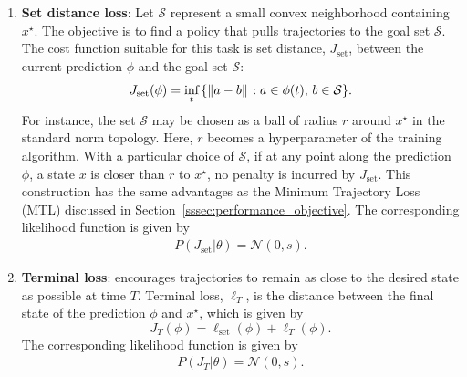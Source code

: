 \begin{enumerate}
\begin{figure}
    \end{figure}
    \item \textbf{Set distance loss}: Let $\mathcal{S}$ represent a small convex
    neighborhood containing $x^\star$. The objective is to find a policy that
    pulls trajectories to the goal set $\mathcal{S}$. The cost function suitable
    for this task is set distance, $J_{\textrm{set}}$, between the current
    prediction $\phi$ and the goal set $\mathcal{S}$:
    \begin{equation}
        J_{\textrm{set}}(\phi)
        = \underset{t}{\textrm{inf}} \, {\{ \|{a - b}\|_{{}_{}}: a \in \phi(t),\, b \in \mathcal{S} \}}.  
        \label{eq:set_distance}
    \end{equation}
    For instance, the set $\mathcal{S}$ may be chosen as a ball of radius
    $r$ around $x^\star$ in the standard norm topology. 
    Here, $r$ becomes a hyperparameter of the training algorithm. With a
    particular choice of $\mathcal{S}$, if at any point along the prediction
    $\phi$, a state $x$ is closer than $r$ to $x^\star$, no penalty is
    incurred by $J_{\textrm{set}}$. This construction has the same advantages as the Minimum Trajectory Loss (MTL) discussed in Section~\ref{sssec:performance_objective}. The corresponding likelihood function is
    given by 
    \begin{align}
        P(J_{\textrm{set}} | \theta) = \mathcal{N}(0, s).
        \label{eq:set_likelihood}
    \end{align}
    \item \textbf{Terminal loss}: encourages trajectories to remain as close to the
    desired state as possible at time $T$. Terminal loss, $\ell_T$, is the
    distance between the final state of the prediction $\phi$ and $x^\star$,
    which is given by
    \begin{equation}
        J_T(\phi) = \ell_{\textrm{set}}(\phi) + \ell_T\left(\phi\right).
        \label{eq:nn_controller_j} 
    \end{equation}
    The corresponding likelihood function is given by 
    \begin{align}
        P(J_T | \theta) = \mathcal{N}(0, s).
        \label{eq:terminal_likelihood}
    \end{align}
\end{enumerate}

